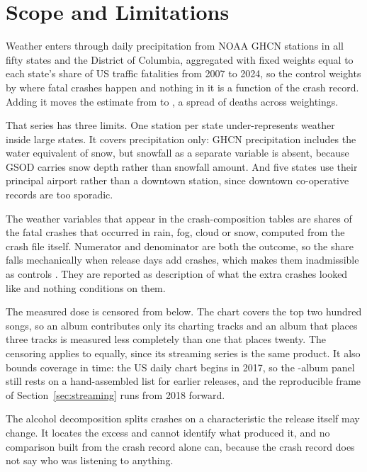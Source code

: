 \documentclass[11pt]{article}
\begin{document}
\section{Scope and Limitations}
\label{sec:limits}

Weather enters through daily precipitation from NOAA GHCN stations in all fifty states and the
District of Columbia, aggregated with fixed weights equal to each state's share of US traffic
fatalities from 2007 to 2024, so the control weights by where fatal crashes happen and nothing in
it is a function of the crash record. Adding it moves the estimate from \numEffectNoWeather{} to
\numEffectWeatherControlled{}, a spread of \numWeatherSpread{} deaths across weightings.



That series has three limits. One station per state under-represents weather inside large states.
It covers precipitation only: GHCN precipitation includes the water equivalent of snow, but
snowfall as a separate variable is absent, because GSOD carries snow depth rather than snowfall
amount. And five states use their principal airport rather than a downtown station, since downtown
co-operative records are too sporadic.

The weather variables that appear in the crash-composition tables are shares of the fatal crashes
that occurred in rain, fog, cloud or snow, computed from the crash file itself. Numerator and
denominator are both the outcome, so the share falls mechanically when release days add crashes,
which makes them inadmissible as controls \citep{angrist2009mostly}. They are reported as
description of what the extra crashes looked like and nothing conditions on them.

The measured dose is censored from below. The chart covers the top two hundred songs, so an album
contributes only its charting tracks and an album that places three tracks is measured less
completely than one that places twenty. The censoring applies to \citet{patel2026smartphones}
equally, since its streaming series is the same product. It also bounds coverage in time: the US
daily chart begins in 2017, so the \numNAllAlbums{}-album panel still rests on a hand-assembled
list for earlier releases, and the reproducible frame of Section~\ref{sec:streaming} runs from
2018 forward.

The alcohol decomposition splits crashes on a characteristic the release itself may change. It
locates the excess and cannot identify what produced it, and no comparison built from the crash
record alone can, because the crash record does not say who was listening to anything.
\end{document}
